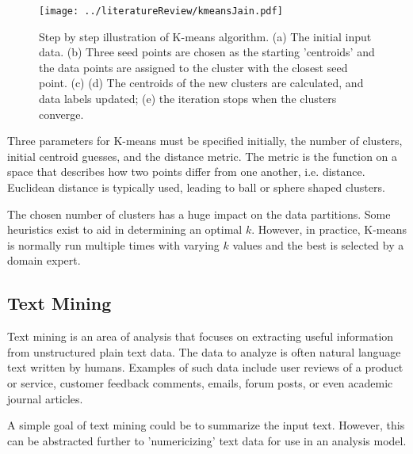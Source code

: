 \documentclass[12pt]{article}
\begin{document}
\begin{doublespacing}
\begin{figure}[!hb]
    \centering
    \texttt{[image: ../literatureReview/kmeansJain.pdf]}
    \caption{Step by step illustration of K-means algorithm. (a) The initial input data. (b) Three seed points are chosen as the starting 'centroids' and the data points are assigned to the cluster with the closest seed point. (c) (d) The centroids of the new clusters are calculated, and data labels updated; (e) the iteration stops when the clusters converge.}
    \label{fig:K-Means-Jain}
\end{figure}

Three parameters for K-means must be specified initially, the number of clusters, initial centroid guesses, and the distance metric.
The metric is the function on a space that describes how two points differ from one another, i.e. distance.
Euclidean distance is typically used, leading to ball or sphere shaped clusters. \citep{Jain2010651}

The chosen number of clusters has a huge impact on the data partitions.
Some heuristics exist to aid in determining an optimal $k$. \citep{tibshirani2001estimating}
However, in practice, K-means is normally run multiple times with varying $k$ values and the best is selected by a domain expert.



\subsection{Text Mining}
Text mining is an area of analysis that focuses on extracting useful information from unstructured plain text data.
The data to analyze is often natural language text written by humans.
Examples of such data include user reviews of a product or service, customer feedback comments, emails, forum posts, or even academic journal articles.

A simple goal of text mining could be to summarize the input text.
However, this can be abstracted further to 'numericizing' text data for use in an analysis model.


\end{doublespacing}
\end{document}
